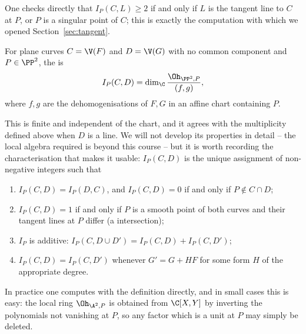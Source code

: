 One checks directly that $I_P(C,L) \geq 2$ if and only if $L$ is the tangent line to $C$ at $P$, or $P$ is a singular point of $C$; this is exactly the computation with which we opened Section~\ref{sec:tangent}.

\begin{definition}
	For plane curves $C = \V(F)$ and $D = \V(G)$ with no common component and $P \in \PP^2$, the  is
	$$I_P(C,D) = \dim_\C \frac{\Oh_{\PP^2,P}}{(f,g)},$$
	where $f,g$ are the dehomogenisations of $F,G$ in an affine chart containing $P$.
\end{definition}

This is finite and independent of the chart, and it agrees with the multiplicity defined above when $D$ is a line. We will not develop its properties in detail -- the local algebra required is beyond this course -- but it is worth recording the characterisation that makes it usable: $I_P(C,D)$ is the unique assignment of non-negative integers such that
\begin{enumerate}[label=(\roman*)]
	\item $I_P(C,D) = I_P(D,C)$, and $I_P(C,D) = 0$ if and only if $P \notin C\cap D$;
	\item $I_P(C,D) = 1$ if and only if $P$ is a smooth point of both curves and their tangent lines at $P$ differ (a  intersection);
	\item $I_P$ is additive: $I_P(C, D\cup D') = I_P(C,D) + I_P(C,D')$;
	\item $I_P(C,D) = I_P(C, D')$ whenever $G' = G + HF$ for some form $H$ of the appropriate degree.
\end{enumerate}

In practice one computes with the definition directly, and in small cases this is easy: the local ring $\Oh_{\A^2,P}$ is obtained from $\C[X,Y]$ by inverting the polynomials not vanishing at $P$, so any factor which is a unit at $P$ may simply be deleted.

